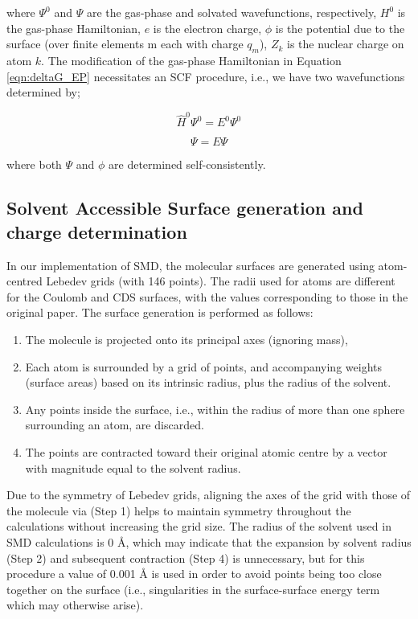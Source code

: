 \documentclass[twoside,twocolumn,9pt]{article}
\begin{document}
where $\Psi^0$ and $\Psi$ are the gas-phase and solvated wavefunctions, respectively,  $H^0$ is the gas-phase Hamiltonian,
$e$ is the electron charge, $\phi$ is the potential due to the surface (over finite elements m each with charge $q_m$),
$Z_k$ is the nuclear charge on atom $k$. The modification of the gas-phase Hamiltonian in Equation \ref{eqn:deltaG_EP} necessitates an
SCF procedure, i.e., we have two wavefunctions determined by;

\begin{equation}
    \hat{H}^0 \Psi^0 = E^0 \Psi^0
\end{equation}

\begin{equation}
    [\hat{H}^0 - \frac{e}{2} \phi] \Psi = E \Psi
\end{equation}

where both $\Psi$ and $\phi $ are determined self-consistently. 

\subsection{Solvent Accessible Surface generation and charge determination}
In our implementation of SMD, the molecular surfaces are generated using atom-centred Lebedev grids 
(with 146 points). The radii used for atoms are different for the Coulomb and CDS surfaces, with the
values corresponding to those in the original paper.\cite{Marenich2009} The surface generation is 
performed as follows:

\begin{enumerate}
    \item The molecule is projected onto its principal axes (ignoring mass),
    \item Each atom is surrounded by a grid of points, and accompanying weights (surface areas) based on 
    its intrinsic radius, plus the radius of the solvent.
    \item Any points inside the surface, i.e., within the radius of more than one sphere surrounding an 
    atom, are discarded.
    \item The points are contracted toward their original atomic centre by a vector with magnitude equal 
    to the solvent radius.
\end{enumerate}

Due to the symmetry of Lebedev grids, aligning the axes of the grid with those of the molecule via (Step 1) helps to maintain symmetry throughout the calculations without increasing the grid size. The radius of the solvent used in SMD calculations is 0 Å, which may indicate that the expansion by solvent radius (Step 2) and subsequent contraction (Step 4) is unnecessary, but for this procedure a value of 0.001 Å is used in order to avoid points being too close together on the surface (i.e., singularities in the surface-surface energy term which may otherwise arise).
\end{document}
